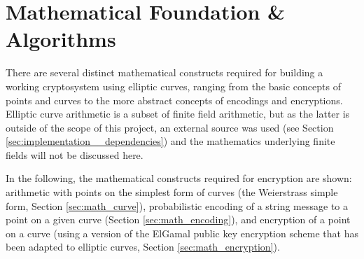 \section{Mathematical Foundation \& Algorithms}
\label{sec:math}
\label{sec:maths}

There are several distinct mathematical constructs required for building a working cryptosystem using elliptic
curves, ranging from the basic concepts of points and curves to the more abstract concepts of encodings and
encryptions. Elliptic curve arithmetic is a subset of finite field arithmetic, but as the latter is outside
of the scope of this project, an external source was used (see Section \ref{sec:implementation__dependencies}) and
the mathematics underlying finite fields will not be discussed here.

In the following, the mathematical constructs required for encryption are shown: arithmetic with points on the simplest
form of curves (the Weierstrass simple form, Section \ref{sec:math_curve}), probabilistic encoding of a string message
to a point on a given curve (Section \ref{sec:math_encoding}), and encryption of a point on a curve (using a version
of the ElGamal public key encryption scheme that has been adapted to elliptic curves, Section \ref{sec:math_encryption}).



